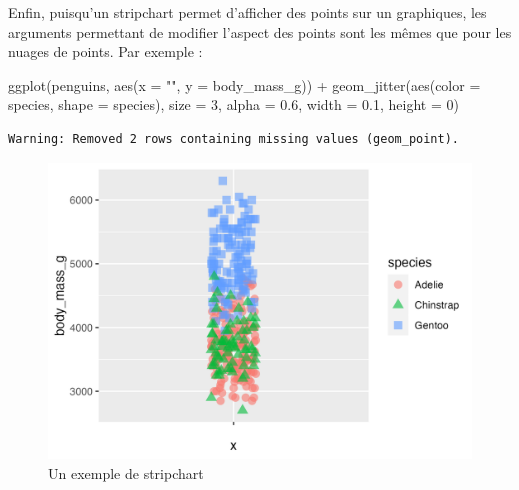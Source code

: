 \documentclass[
  letterpaper,
  DIV=11,
  numbers=noendperiod]{scrreprt}
\newenvironment{Shaded}{\begin{snugshade}}{\end{snugshade}}
\newcommand{\AttributeTok}[1]{\textcolor[rgb]{0.40,0.45,0.13}{#1}}
\newcommand{\DecValTok}[1]{\textcolor[rgb]{0.68,0.00,0.00}{#1}}
\newcommand{\FloatTok}[1]{\textcolor[rgb]{0.68,0.00,0.00}{#1}}
\newcommand{\FunctionTok}[1]{\textcolor[rgb]{0.28,0.35,0.67}{#1}}
\newcommand{\NormalTok}[1]{\textcolor[rgb]{0.00,0.23,0.31}{#1}}
\newcommand{\SpecialCharTok}[1]{\textcolor[rgb]{0.37,0.37,0.37}{#1}}
\newcommand{\StringTok}[1]{\textcolor[rgb]{0.13,0.47,0.30}{#1}}
\begin{document}
Enfin, puisqu'un stripchart permet d'afficher des points sur un
graphiques, les arguments permettant de modifier l'aspect des points
sont les mêmes que pour les nuages de points. Par exemple :

\begin{Shaded}
\begin{Highlighting}[]
\FunctionTok{ggplot}\NormalTok{(penguins, }\FunctionTok{aes}\NormalTok{(}\AttributeTok{x =} \StringTok{""}\NormalTok{, }\AttributeTok{y =}\NormalTok{ body\_mass\_g)) }\SpecialCharTok{+}
  \FunctionTok{geom\_jitter}\NormalTok{(}\FunctionTok{aes}\NormalTok{(}\AttributeTok{color =}\NormalTok{ species, }\AttributeTok{shape =}\NormalTok{ species),}
              \AttributeTok{size =} \DecValTok{3}\NormalTok{, }\AttributeTok{alpha =} \FloatTok{0.6}\NormalTok{, }
              \AttributeTok{width =} \FloatTok{0.1}\NormalTok{, }\AttributeTok{height =} \DecValTok{0}\NormalTok{)}
\end{Highlighting}
\end{Shaded}

\begin{verbatim}
Warning: Removed 2 rows containing missing values (geom_point).
\end{verbatim}

\begin{figure}[H]

{\centering \includegraphics{./03-visualization_files/figure-pdf/fig-strip-1.png}

}

\caption{\label{fig-strip}Un exemple de stripchart}

\end{figure}
\end{document}
